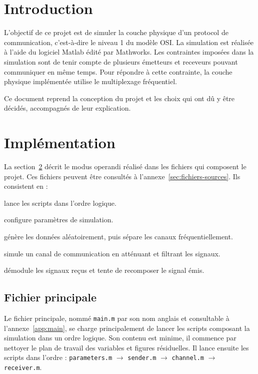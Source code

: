\documentclass[10pt, oneside, a4paper]{article}
\begin{document}
\tableofcontents
\newpage

\section{Introduction}
L'objectif de ce projet est de simuler la couche physique d'un protocol de communication, c'est-à-dire le niveau 1 du modèle OSI.
La simulation est réalisée à l'aide du logiciel Matlab\textregistered{} édité par Mathworks\textregistered{}.
Les contraintes imposées dans la simulation sont de tenir compte de plusieurs émetteurs et receveurs pouvant communiquer en même temps.
Pour répondre à cette contrainte, la couche physique implémentée utilise le multiplexage fréquentiel.

Ce document reprend la conception du projet et les choix qui ont dû y être décidés, accompagnés de leur explication.


\section{Implémentation}
\label{sec:implementation}
La section~\ref{sec:implementation} décrit le modus operandi réalisé dans les fichiers qui composent le projet.
Ces fichiers peuvent être consultés à l'annexe~\ref{sec:fichiers-sources}.
Ils consistent en :
\begin{description}[align=right,labelwidth=2cm,labelindent=1cm]
	\item[main.m] lance les scripts dans l'ordre logique.
	\item[parameters.m] configure paramètres de simulation.
	\item[sender.m] génère les données aléatoirement, puis sépare les canaux
		fréquentiellement.
	\item[channel.m] simule un canal de communication en atténuant et filtrant les signaux.
	\item[receiver.m] démodule les signaux reçus et tente de recomposer le signal émis.
\end{description}

\subsection{Fichier principale}
Le fichier principale, nommé \texttt{main.m} par son nom anglais et consultable à l'annexe~\ref{app:main}, se charge principalement de lancer les scripts composant la simulation dans un ordre logique.
Son contenu est minime, il commence par nettoyer le plan de travail des variables et figures résiduelles.
Il lance ensuite les scripts dans l'ordre : \texttt{parameters.m} $\rightarrow$ \texttt{sender.m} $\rightarrow$ \texttt{channel.m} $\rightarrow$ \texttt{receiver.m}.
\end{document}
